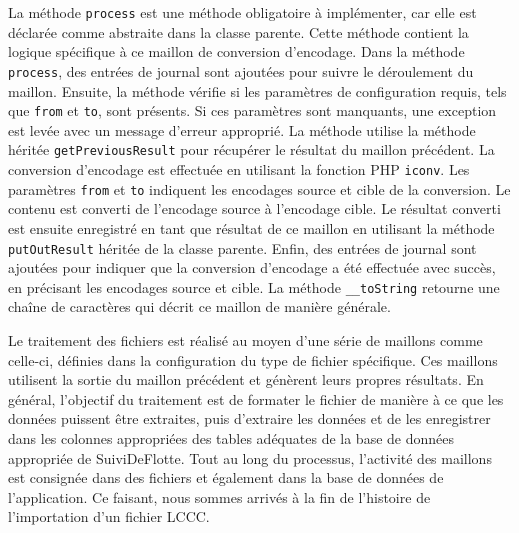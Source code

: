 
La méthode \Verb|process| est une méthode obligatoire à implémenter, car elle est déclarée comme abstraite dans la classe parente. Cette méthode contient la logique spécifique à ce maillon de conversion d'encodage. Dans la méthode \Verb|process|, des entrées de journal sont ajoutées pour suivre le déroulement du maillon. Ensuite, la méthode vérifie si les paramètres de configuration requis, tels que \Verb|from| et \Verb|to|, sont présents. Si ces paramètres sont manquants, une exception est levée avec un message d'erreur approprié. La méthode utilise la méthode héritée \Verb|getPreviousResult| pour récupérer le résultat du maillon précédent. La conversion d'encodage est effectuée en utilisant la fonction PHP \Verb|iconv|. Les paramètres \Verb|from| et \Verb|to| indiquent les encodages source et cible de la conversion. Le contenu est converti de l'encodage source à l'encodage cible. Le résultat converti est ensuite enregistré en tant que résultat de ce maillon en utilisant la méthode \Verb|putOutResult| héritée de la classe parente. Enfin, des entrées de journal sont ajoutées pour indiquer que la conversion d'encodage a été effectuée avec succès, en précisant les encodages source et cible. La méthode \Verb|__toString| retourne une chaîne de caractères qui décrit ce maillon de manière générale.

Le traitement des fichiers est réalisé au moyen d'une série de maillons comme celle-ci, définies dans la configuration du type de fichier spécifique. Ces maillons utilisent la sortie du maillon précédent et génèrent leurs propres résultats. En général, l'objectif du traitement est de formater le fichier de manière à ce que les données puissent être extraites, puis d'extraire les données et de les enregistrer dans les colonnes appropriées des tables adéquates de la base de données appropriée de SuiviDeFlotte. Tout au long du processus, l'activité des maillons est consignée dans des fichiers et également dans la base de données de l'application. Ce faisant, nous sommes arrivés à la fin de l'histoire de l'importation d'un fichier LCCC.